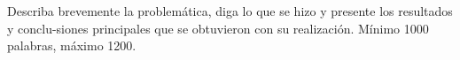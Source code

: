 \fontsize{11pt}{11pt}\selectfont %
\vspace*{0.5cm}
Describa brevemente la problemática, diga lo que se hizo y presente los resultados y conclu-siones principales que se obtuvieron con su realización. Mínimo 1000 palabras, máximo 1200.